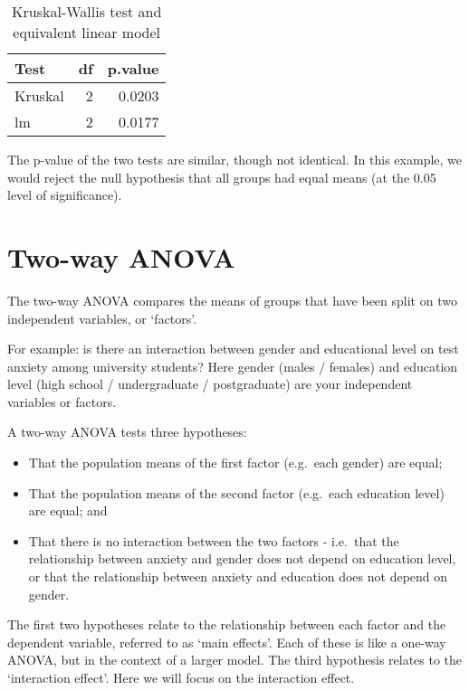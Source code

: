 \documentclass[
  12pt,
]{krantz}
\providecommand{\tightlist}{%
  \setlength{\itemsep}{0pt}\setlength{\parskip}{0pt}}
\begin{document}
\begin{table}

\caption{\label{tab:unnamed-chunk-42}Kruskal-Wallis test and equivalent linear model}
\centering
\begin{tabular}[t]{lrr}
\toprule
Test & df & p.value\\
\midrule
Kruskal & 2 & 0.0203\\
lm & 2 & 0.0177\\
\bottomrule
\end{tabular}
\end{table}

The p-value of the two tests are similar, though not identical. In this example, we would reject the null hypothesis that all groups had equal means (at the 0.05 level of significance).

\hypertarget{two-way-anova}{%
\section{Two-way ANOVA}\label{two-way-anova}}

The two-way ANOVA compares the means of groups that have been split on two independent variables, or `factors'.

For example: is there an interaction between gender and educational level on test anxiety among university students? Here gender (males / females) and education level (high school / undergraduate / postgraduate) are your independent variables or factors.

A two-way ANOVA tests three hypotheses:

\begin{itemize}
\tightlist
\item
  That the population means of the first factor (e.g.~each gender) are equal;
\item
  That the population means of the second factor (e.g.~each education level) are equal; and
\item
  That there is no interaction between the two factors - i.e.~that the relationship between anxiety and gender does not depend on education level, or that the relationship between anxiety and education does not depend on gender.
\end{itemize}

The first two hypotheses relate to the relationship between each factor and the dependent variable, referred to as `main effects'. Each of these is like a one-way ANOVA, but in the context of a larger model. The third hypothesis relates to the `interaction effect'. Here we will focus on the interaction effect.
\end{document}
